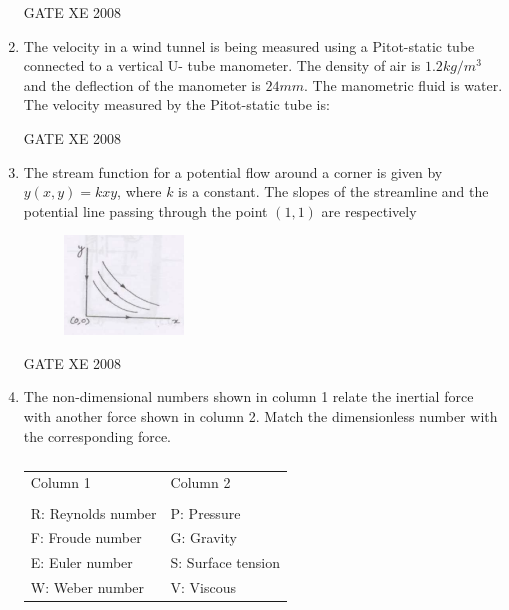 \documentclass[12pt]{article}
\begin{document}
\begin{enumerate}
GATE XE 2008
\item The velocity in a wind tunnel is being measured using a Pitot-static tube connected to a vertical U- tube manometer. The density of air is $1.2 kg/m^3$ and the deflection of the manometer is $24 mm$. The manometric fluid is water. The velocity measured by the Pitot-static tube is:

\begin{enumerate}
\end{enumerate}


GATE XE 2008
\item  The stream function for a potential flow around a corner is given by $y(x, y) = kxy$, where $k$ is a constant. The slopes of the streamline and the potential line passing through the point $(1,1)$ are respectively

\begin{figure}[H]
\centering
  \includegraphics[width=0.3\textwidth]{figs/ass1_d_q12.png}
  \caption{}
\end{figure} 

\begin{enumerate}
\end{enumerate}

GATE XE 2008
\item The non-dimensional numbers shown in column 1 relate the inertial force with another force shown in column 2. Match the dimensionless number with the corresponding force.

\begin{table}[H]     \centering     \caption{}     \label{}     \begin{tabular}{l   l}
    Column 1 & Column 2 \\
      &  \\
   R: Reynolds number & P: Pressure\\
F: Froude number & G: Gravity\\
E: Euler number & S: Surface tension\\
W: Weber number & V: Viscous\\
\end{tabular} \end{table}


\end{enumerate}
\end{document}
